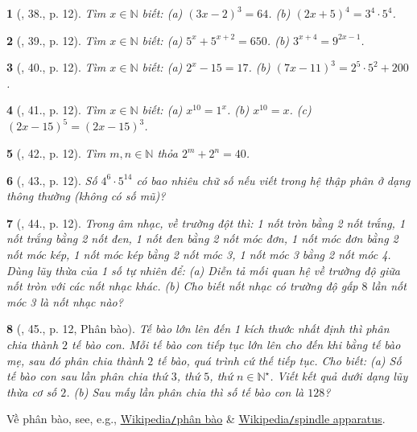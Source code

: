 \documentclass{article}
\newtheorem{baitoan}{}
\begin{document}
\begin{baitoan}[\cite{Tuyen_Toan_6}, 38., p. 12]
	Tìm $x\in\mathbb{N}$ biết: (a) $(3x - 2)^3 = 64$. (b) $(2x + 5)^4 = 3^4\cdot5^4$.
\end{baitoan}

\begin{baitoan}[\cite{Tuyen_Toan_6}, 39., p. 12]
	Tìm $x\in\mathbb{N}$ biết: (a) $5^x + 5^{x + 2} = 650$. (b) $3^{x + 4} = 9^{2x - 1}$.
\end{baitoan}

\begin{baitoan}[\cite{Tuyen_Toan_6}, 40., p. 12]
	Tìm $x\in\mathbb{N}$ biết: (a) $2^x - 15 = 17$. (b) $(7x - 11)^3 = 2^5\cdot5^2 + 200$.
\end{baitoan}

\begin{baitoan}[\cite{Tuyen_Toan_6}, 41., p. 12]
	Tìm $x\in\mathbb{N}$ biết: (a) $x^{10} = 1^x$. (b) $x^{10} = x$. (c) $(2x - 15)^5 = (2x - 15)^3$.
\end{baitoan}

\begin{baitoan}[\cite{Tuyen_Toan_6}, 42., p. 12]
	Tìm $m,n\in\mathbb{N}$ thỏa $2^m + 2^n = 40$.
\end{baitoan}

\begin{baitoan}[\cite{Tuyen_Toan_6}, 43., p. 12]
	Số $4^6\cdot5^{14}$ có bao nhiêu chữ số nếu viết trong hệ thập phân ở dạng thông thường (không có số mũ)?
\end{baitoan}

\begin{baitoan}[\cite{Tuyen_Toan_6}, 44., p. 12]
	Trong âm nhạc, về trường đột thì: 1 nốt tròn bằng 2 nốt trắng, 1 nốt trắng bằng 2 nốt đen, 1 nốt đen bằng 2 nốt móc đơn, 1 nốt móc đơn bằng 2 nốt móc kép, 1 nốt móc kép bằng 2 nốt móc 3, 1 nốt móc 3 bằng 2 nốt móc 4. Dùng lũy thừa của 1 số tự nhiên để: (a) Diễn tả mối quan hệ về trường độ giữa nốt tròn với các nốt nhạc khác. (b) Cho biết nốt nhạc có trường độ gấp $8$ lần nốt móc 3 là nốt nhạc nào?
\end{baitoan}

\begin{baitoan}[\cite{Tuyen_Toan_6}, 45., p. 12, Phân bào]
	Tế bào lớn lên đến 1 kích thước nhất định thì phân chia thành $2$ tế bào con. Mỗi tế bào con tiếp tục lớn lên cho đến khi bằng tế bào mẹ, sau đó phân chia thành $2$ tế bào, quá trình cứ thế tiếp tục. Cho biết: (a) Số tế bào con sau lần phân chia thứ $3$, thứ $5$, thứ $n\in\mathbb{N}^\star$. Viết kết quả dưới dạng lũy thừa cơ số $2$. (b) Sau mấy lần phân chia thì số tế bào con là $128$?
\end{baitoan}
Về phân bào, see, e.g., \href{https://vi.wikipedia.org/wiki/Ph%C3%A2n_b%C3%A0o}{Wikipedia{\tt/}phân bào} \& \href{https://en.wikipedia.org/wiki/Spindle_apparatus}{Wikipedia{\tt/}spindle apparatus}.
\end{document}
